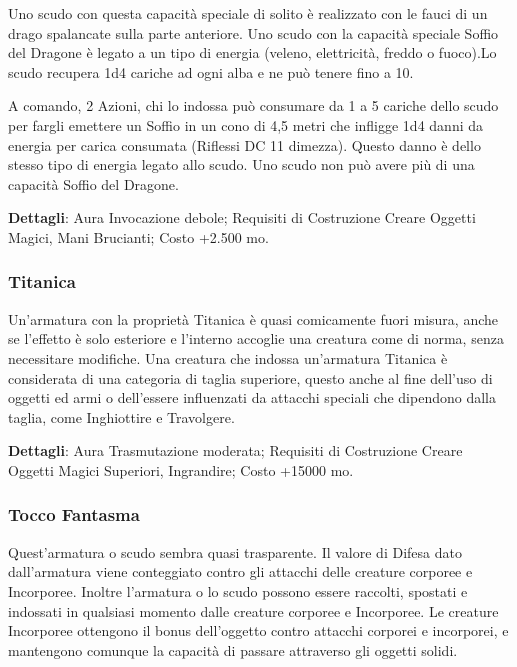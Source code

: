 \begin{multicols}{2}
	Uno scudo con questa capacità speciale di solito è realizzato con le fauci di un drago spalancate sulla parte anteriore. Uno scudo con la capacità speciale Soffio del Dragone è legato a un tipo di energia (veleno, elettricità, freddo o fuoco).Lo scudo recupera 1d4 cariche ad ogni alba e ne può tenere fino a 10.

	A comando, 2 Azioni, chi lo indossa può consumare da 1 a 5 cariche dello scudo per fargli emettere un Soffio in un cono di 4,5 metri che infligge 1d4 danni da energia per carica consumata (Riflessi DC 11 dimezza). Questo danno è dello stesso tipo di energia legato allo scudo. Uno scudo non può avere più di una capacità Soffio del Dragone.

	\textbf{Dettagli}: Aura Invocazione debole; Requisiti di Costruzione Creare Oggetti Magici, Mani Brucianti; Costo +2.500 mo.

	\subsubsection*{Titanica}

	Un'armatura con la proprietà Titanica è quasi comicamente fuori misura, anche se l'effetto è solo esteriore e l'interno accoglie una creatura come di norma, senza necessitare modifiche. Una creatura che indossa un'armatura Titanica è considerata di una categoria di taglia superiore, questo anche al fine dell'uso di oggetti ed armi o dell'essere influenzati da attacchi speciali che dipendono dalla taglia, come Inghiottire e Travolgere.

	\textbf{Dettagli}: Aura Trasmutazione moderata; Requisiti di Costruzione Creare Oggetti Magici Superiori, Ingrandire; Costo +15000 mo.

	\subsubsection*{Tocco Fantasma}

	Quest'armatura o scudo sembra quasi trasparente. Il valore di Difesa dato dall'armatura viene conteggiato contro gli attacchi delle creature corporee e Incorporee. Inoltre l'armatura o lo scudo possono essere raccolti, spostati e indossati in qualsiasi momento dalle creature corporee e Incorporee. Le creature Incorporee ottengono il bonus dell'oggetto contro attacchi corporei e incorporei, e mantengono comunque la capacità di passare attraverso gli oggetti solidi.


\end{multicols}
